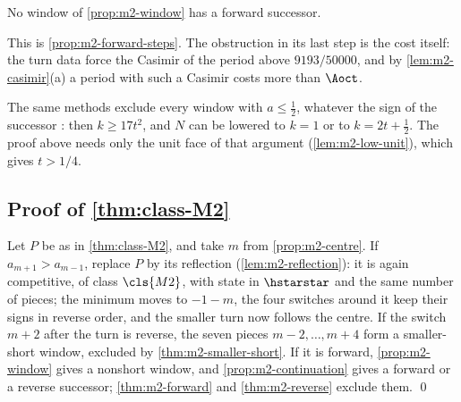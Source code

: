 \begin{theorem}\label{thm:m2-forward}
No window of \cref{prop:m2-window} has a forward successor.
\end{theorem}

This is \cref{prop:m2-forward-steps}. The obstruction in its last step is the cost itself: the turn
data force the Casimir of the period above $9193/50000$, and by \cref{lem:m2-casimir}(a) a period
with such a Casimir costs more than $\Aoct$.

\begin{remark}\label{rem:m2-low-scale}
The same methods exclude every window with $a\le\frac12$, whatever the sign of the successor
\cite[\texttt{MIXED\_\allowbreak NONSHORT\_\allowbreak LOW\_\allowbreak SCALE\_\allowbreak HAND\_\allowbreak EXCLUSION}]{Notes}: then $k\ge17t^2$, and
$N$ can be lowered to $k=1$ or to $k=2t+\frac12$. The proof above needs only the unit face of that
argument (\cref{lem:m2-low-unit}), which gives $t>1/4$.
\end{remark}


\subsection{Proof of \texorpdfstring{\cref{thm:class-M2}}{the theorem for class M2}}\label{sec:m2-proof}

Let $P$ be as in \cref{thm:class-M2}, and take $m$ from \cref{prop:m2-centre}. If $a_{m+1}>a_{m-1}$,
replace $P$ by its reflection (\cref{lem:m2-reflection}): it is again competitive, of class
$\cls{M2}$, with state in $\hstarstar$ and the same number of pieces; the minimum moves to $-1-m$,
the four switches around it keep their signs in reverse order, and the smaller turn now follows the
centre. If the switch $m+2$ after the turn is reverse, the seven pieces $m-2,\dots,m+4$ form a
smaller-short window, excluded by \cref{thm:m2-smaller-short}. If it is forward, \cref{prop:m2-window} gives a nonshort window,
and \cref{prop:m2-continuation} gives a forward or a reverse successor; \cref{thm:m2-forward}
and \cref{thm:m2-reverse} exclude them. \qed
